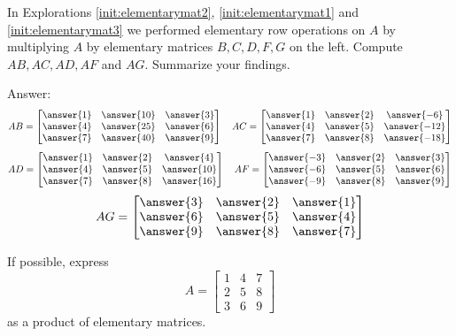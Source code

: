 \documentclass{ximera}
\begin{document}
\begin{problem}\label{prob:explorationelemmat} In Explorations \ref{init:elementarymat2}, \ref{init:elementarymat1} and \ref{init:elementarymat3} we performed elementary row operations on $A$ by multiplying $A$ by elementary matrices $B, C, D, F, G$ on the left.  Compute $AB, AC, AD, AF$ and $AG$.  Summarize your findings.

Answer:
$$AB=\begin{bmatrix}\answer{1} & \answer{10} & \answer{3} \\ \answer{4} & \answer{25} & \answer{6}\\ \answer{7} & \answer{40} & \answer{9}\end{bmatrix}
\quad
AC=\begin{bmatrix}\answer{1} & \answer{2} & \answer{-6} \\ \answer{4} & \answer{5} & \answer{-12}\\ \answer{7} & \answer{8} & \answer{-18}\end{bmatrix}$$
$$AD=\begin{bmatrix}\answer{1} & \answer{2} & \answer{4} \\ \answer{4} & \answer{5} & \answer{10}\\ \answer{7} & \answer{8} & \answer{16}\end{bmatrix}
\quad
AF=\begin{bmatrix}\answer{-3} & \answer{2} & \answer{3} \\ \answer{-6} & \answer{5} & \answer{6}\\ \answer{-9} & \answer{8} & \answer{9}\end{bmatrix}$$
$$AG=\begin{bmatrix}\answer{3} & \answer{2} & \answer{1} \\ \answer{6} & \answer{5} & \answer{4}\\ \answer{9} & \answer{8} & \answer{7}\end{bmatrix}
$$
\end{problem}


\begin{problem}\label{prob:expressasprodelemmat} If possible, express 
$$A=\begin{bmatrix}1&4&7\\2&5&8\\3&6&9\end{bmatrix}$$
as a product of elementary matrices.
\end{problem}
\end{document}
